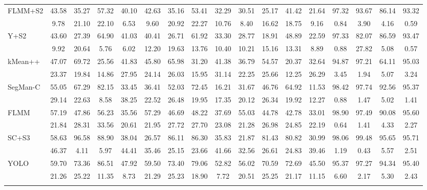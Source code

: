 \documentclass[preprint,12pt]{elsarticle}
\begin{document}
\begin{table}[!htbp]
\begin{tabular}{lcccccccccccccccc}
FLMM+S2 & 43.58 & 35.27 & 57.32 & 40.10 & 42.63 & 35.16 & 53.41 & 32.29 & 30.51 & 25.17 & 41.42 & 21.64 & 97.32 & 93.67 & 86.14 & 93.32 \\
  & 9.78 & 21.10 & 22.10 & 6.53 & 9.60 & 20.92 & 22.27 & 10.76 & 8.40 & 16.62 & 18.75 & 9.16 & 0.84 & 3.90 & 4.16 & 0.59 \\ \addlinespace[3pt]
Y+S2 & 43.60 & 27.39 & 64.90 & 41.03 & 40.41 & 26.71 & 61.92 & 33.30 & 28.77 & 18.91 & 48.89 & 22.59 & 97.33 & 82.07 & 86.59 & 93.47 \\
  & 9.92 & 20.64 & 5.76 & 6.02 & 12.20 & 19.63 & 13.76 & 10.40 & 10.21 & 15.16 & 13.31 & 8.89 & 0.88 & 27.82 & 5.08 & 0.57 \\ \addlinespace[3pt]
\rowcolor{gray!12}
kMean++ & 47.07 & 69.72 & 25.56 & 41.83 & 45.80 & 65.98 & 31.20 & 41.38 & 36.79 & 54.57 & 20.37 & 32.64 & 94.87 & 97.21 & 64.11 & 95.03 \\
  & 23.37 & 19.84 & 14.86 & 27.95 & 24.14 & 26.03 & 15.95 & 31.14 & 22.25 & 25.66 & 12.25 & 26.29 & 3.45 & 1.94 & 5.07 & 3.24 \\ \addlinespace[3pt]
SegMan-C & 55.05 & 67.29 & 82.15 & 33.45 & 36.41 & 52.03 & 72.45 & 16.21 & 31.67 & 46.76 & 64.92 & 11.53 & 98.42 & 97.74 & 92.56 & 95.37 \\
  & 29.14 & 22.63 & 8.58 & 38.25 & 22.52 & 26.48 & 19.95 & 17.35 & 20.12 & 26.34 & 19.92 & 12.27 & 0.88 & 1.47 & 5.02 & 1.41 \\ \addlinespace[3pt]
\rowcolor{gray!12}
FLMM & 57.19 & 47.86 & 56.23 & 35.56 & 57.29 & 46.69 & 48.22 & 37.69 & 55.03 & 44.78 & 42.78 & 33.01 & 98.90 & 97.49 & 90.08 & 95.60 \\
  & 21.84 & 28.31 & 33.56 & 20.61 & 21.95 & 27.72 & 27.70 & 23.08 & 21.28 & 26.98 & 24.85 & 22.19 & 0.64 & 1.41 & 4.33 & 2.27 \\ \addlinespace[3pt]
SC+S3 & 58.63 & 96.58 & 88.90 & 38.04 & 26.57 & 86.11 & 86.30 & 35.83 & 21.87 & 81.43 & 80.82 & 30.99 & 98.06 & 99.48 & 95.65 & 95.71 \\
  & 46.37 & 4.11 & 5.97 & 44.41 & 35.46 & 25.15 & 23.66 & 41.66 & 32.56 & 26.61 & 24.83 & 39.46 & 1.19 & 0.43 & 5.57 & 2.51 \\ \addlinespace[3pt]
\rowcolor{gray!12}
YOLO & 59.70 & 73.36 & 86.51 & 47.92 & 59.50 & 73.40 & 79.06 & 52.82 & 56.02 & 70.59 & 72.69 & 45.50 & 95.37 & 97.27 & 94.34 & 95.40 \\
  & 21.26 & 25.22 & 11.35 & 8.73 & 21.29 & 25.23 & 18.90 & 7.72 & 20.51 & 25.25 & 21.17 & 11.15 & 6.60 & 2.17 & 5.30 & 2.43 \\ \addlinespace[3pt]

\end{tabular}
\end{table}
\end{document}
